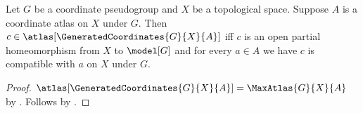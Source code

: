 \begin{theorem}\label{generated_coordinates_chart_iff}
    Let $G$ be a coordinate pseudogroup and $X$ be a topological space.
    Suppose $A$ is a coordinate atlas on $X$ under $G$.
    Then $c\in\atlas[\GeneratedCoordinates{G}{X}{A}]$ iff
        $c$ is an open partial homeomorphism from $X$ to $\model[G]$ and
        for every $a\in A$ we have $c$ is compatible with $a$ on $X$ under $G$.
\end{theorem}
\begin{proof}
    $\atlas[\GeneratedCoordinates{G}{X}{A}]=\MaxAtlas{G}{X}{A}$ by
        .
    Follows by .
\end{proof}
